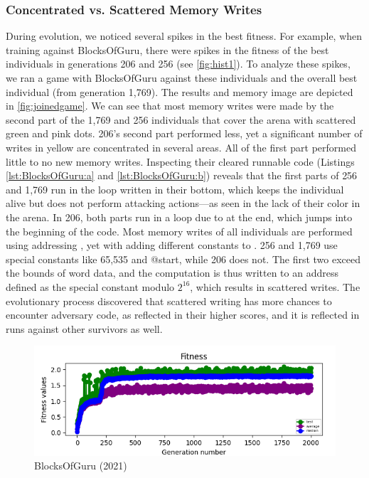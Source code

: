 \documentclass[dvipsnames, format=sigconf]{acmart}
\begin{document}
\subsubsection{Concentrated vs. Scattered Memory Writes}
\label{scattered}
During evolution, we noticed several spikes in the best fitness. For example, when training against BlocksOfGuru, there were spikes in the fitness of the best individuals in generations 206 and 256 (see \autoref{fig:hist1}). To analyze these spikes, we ran a game with BlocksOfGuru against these individuals and the overall best individual (from generation 1,769). The results and memory image are depicted in \autoref{fig:joinedgame}.
We can see that most memory writes were made by the second part of the 1,769 and 256 individuals that cover the arena with scattered green and pink dots. 206's second part performed less, yet a significant number of writes in yellow are concentrated in several areas. All of the first part performed little to no new memory writes. Inspecting their cleared runnable code (Listings \ref{lst:BlocksOfGuru:a} and \ref{lst:BlocksOfGuru:b}) reveals that the first parts of 256 and 1,769 run in the loop written in their bottom, which keeps the individual alive but does not perform attacking actions---as seen in the lack of their color in the arena. In 206, both parts run in a loop due to  at the end, which jumps into the beginning of the code. Most memory writes of all individuals are performed using addressing , yet with adding different constants to . 256 and 1,769 use special constants like 65,535 and @start, while 206 does not. The first two exceed the bounds of word data, and the computation is thus written to an address defined as the special constant modulo $2^{16}$, which results in scattered writes. The evolutionary process discovered that scattered writing has more chances to encounter adversary code, as reflected in their higher scores, and it is reflected in runs against other survivors as well. 

\begin{figure}
    \centering
    \includegraphics[width=\linewidth]{images/blocksofguru_hist_clipped.png}
    \caption{BlocksOfGuru (2021)}
    \label{fig:hist1}
\end{figure}
\end{document}
